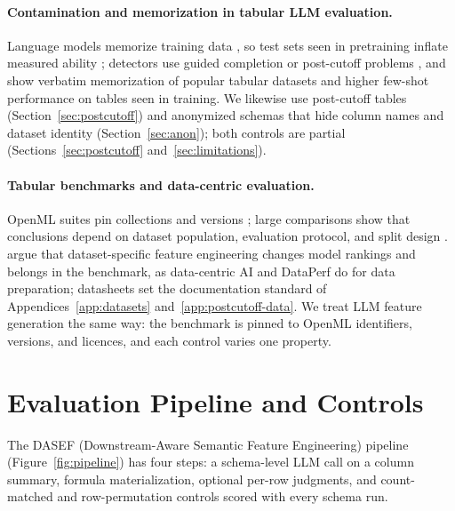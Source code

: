 \paragraph{Contamination and memorization in tabular LLM evaluation.}

Language models memorize training data \citep{carlini2023quantifying}, so test sets seen in pretraining inflate measured ability \citep{sainz2023nlp,xu2024benchmark}; detectors use guided completion \citep{golchin2024time} or post-cutoff problems \citep{roberts2024cutoff,white2025livebench}, and \citet{bordt2023testing,bordt2024elephants} show verbatim memorization of popular tabular datasets and higher few-shot performance on tables seen in training. We likewise use post-cutoff tables (Section~\ref{sec:postcutoff}) and anonymized schemas that hide column names and dataset identity (Section~\ref{sec:anon}); both controls are partial (Sections~\ref{sec:postcutoff} and~\ref{sec:limitations}).

\paragraph{Tabular benchmarks and data-centric evaluation.}

OpenML suites pin collections and versions \citep{vanschoren2014openml,bischl2021openml}; large comparisons show that conclusions depend on dataset population, evaluation protocol, and split design \citep{gorishniy2021revisiting,grinsztajn2022tree,mcelfresh2023neural,ye2024closer,erickson2025tabarena,rubachev2025tabred}. \citet{tschalzev2024datacentric} argue that dataset-specific feature engineering changes model rankings and belongs in the benchmark, as data-centric AI \citep{zha2025datacentric,liang2022advances} and DataPerf \citep{mazumder2023dataperf} do for data preparation; datasheets \citep{gebru2021datasheets} set the documentation standard of Appendices~\ref{app:datasets} and~\ref{app:postcutoff-data}. We treat LLM feature generation the same way: the benchmark is pinned to OpenML identifiers, versions, and licences, and each control varies one property.

\section{Evaluation Pipeline and Controls}\label{sec:method-the-dasef-pipeline}

The DASEF (Downstream-Aware Semantic Feature Engineering) pipeline (Figure~\ref{fig:pipeline}) has four steps: a schema-level LLM call on a column summary, formula materialization, optional per-row judgments, and count-matched and row-permutation controls scored with every schema run.

